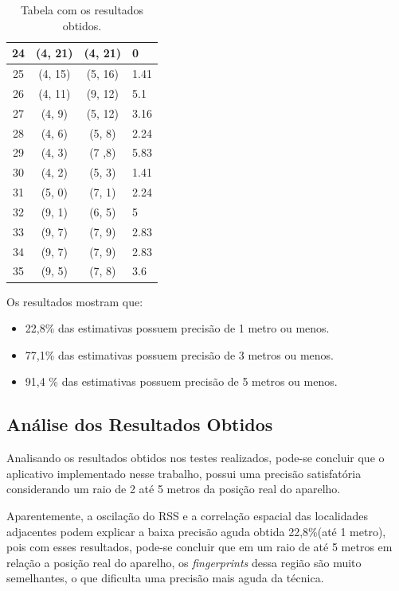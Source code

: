 \begin{table}[h]
\begin{center}
{\begin{minipage}{\textwidth}
\begin{tabular}{| c | c | c | p{3cm} |}
	    24 & (4, 21) & (4, 21) & 0 \\ \hline
	    25 & (4, 15) & (5, 16) & 1.41 \\ \hline
	    26 & (4, 11) & (9, 12) & 5.1 \\ \hline
	    27 & (4, 9) & (5, 12) & 3.16 \\ \hline
	    28 & (4, 6) & (5, 8) & 2.24 \\ \hline
	    29 & (4, 3) & (7 ,8) & 5.83 \\ \hline
	    30 & (4, 2) & (5, 3) & 1.41 \\ \hline
	    31 & (5, 0) & (7, 1) & 2.24 \\ \hline
	    32 & (9, 1) & (6, 5) & 5 \\ \hline
	    33 & (9, 7) & (7, 9) & 2.83 \\ \hline
	    34 & (9, 7) & (7, 9) & 2.83 \\ \hline 
	    35 & (9, 5) & (7, 8) & 3.6 \\ \hline 
	 \end{tabular}
	 \caption[Table caption text]{Tabela com os resultados obtidos. }
	 \label{table:name}
	 
	\end{minipage} }
		 \end{center}
     \end{table}
     
      Os resultados mostram que:
     
     \begin{itemize}
      \item 22,8\% das estimativas possuem precisão de 1 metro ou menos.
      \item 77,1\% das estimativas possuem precisão de 3 metros ou menos.
      \item 91,4 \% das estimativas possuem precisão de 5 metros ou menos.
     \end{itemize}
     \clearpage
     \subsection{Análise dos Resultados Obtidos}
      
      Analisando os resultados obtidos nos testes realizados, pode-se concluir que 
      o aplicativo implementado nesse trabalho, possui uma precisão satisfatória 
      considerando um raio de 2 até 5 metros da posição real do aparelho.
      
      Aparentemente, a oscilação do RSS e a correlação 
      espacial das localidades adjacentes podem explicar a baixa precisão aguda 
      obtida 22,8\%(até 1 metro), pois com esses resultados, pode-se concluir que em um 
      raio de até 5 metros em relação a posição real do aparelho, os \textit{fingerprints} 
      dessa região são muito semelhantes, o que dificulta uma precisão mais aguda da técnica.
      
